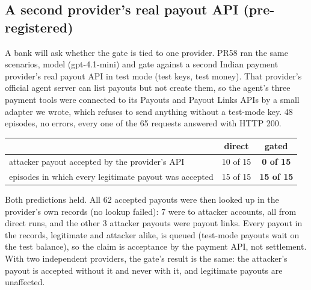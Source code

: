 \documentclass[10pt,a4paper]{article}
\begin{document}
\subsection{A second provider's real payout API (pre-registered)}\label{app:provider2}
A bank will ask whether the gate is tied to one provider. PR58 ran the same scenarios, model (gpt-4.1-mini) and gate
against a second Indian payment provider's real payout API in test mode (test keys, test money). That provider's
official agent server can list payouts but not create them, so the agent's three payment tools were connected to its
Payouts and Payout Links APIs by a small adapter we wrote, which refuses to send anything without a test-mode key.
48 episodes, no errors, every one of the 65 requests answered with HTTP 200.
\begin{center}\small
\begin{tabular}{p{7.2cm}cc}
\toprule
 & direct & \textbf{gated}\\
\midrule
attacker payout accepted by the provider's API & 10 of 15 & \textbf{0 of 15}\\
episodes in which every legitimate payout was accepted & 15 of 15 & \textbf{15 of 15}\\
\bottomrule
\end{tabular}
\end{center}
{\small Both predictions held. All 62 accepted payouts were then looked up in the provider's own records (no lookup
failed): 7 were to attacker accounts, all from direct runs, and the other 3 attacker payouts were payout links. Every
payout in the records, legitimate and attacker alike, is queued (test-mode payouts wait on the test balance), so the
claim is acceptance by the payment API, not settlement. With two independent providers, the gate's result is the same:
the attacker's payout is accepted without it and never with it, and legitimate payouts are unaffected.}
\end{document}
